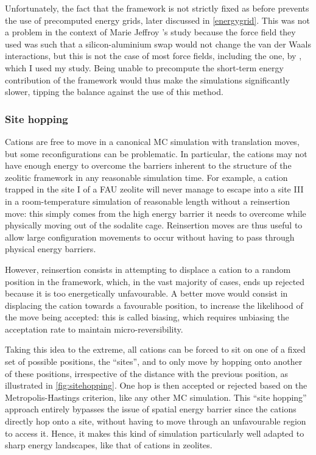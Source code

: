 \documentclass[main.tex]{subfiles}
\begin{document}
Unfortunately, the fact that the framework is not strictly fixed as before prevents the use of precomputed energy grids, later discussed in \cref{energygrid}. This was not a problem in the context of Marie Jeffroy \cite{Jeffroy}'s study because the force field they used was such that a silicon-aluminium swap would not change the van der Waals interactions, but this is not the case of most force fields, including the one, by \textcite{BoulfelfelSholl2021}, which I used my study. Being unable to precompute the short-term energy contribution of the framework would thus make the simulations significantly slower, tipping the balance against the use of this method.

\subsubsection{Site hopping}

\label{sitehopping}

Cations are free to move in a canonical MC simulation with translation moves, but some reconfigurations can be problematic. In particular, the cations may not have enough energy to overcome the barriers inherent to the structure of the zeolitic framework in any reasonable simulation time. For example, a cation trapped in the site I of a FAU zeolite will never manage to escape into a site III in a room-temperature simulation of reasonable length without a reinsertion move: this simply comes from the high energy barrier it needs to overcome while physically moving out of the sodalite cage. Reinsertion moves are thus useful to allow large configuration movements to occur without having to pass through physical energy barriers.

However, reinsertion consists in attempting to displace a cation to a random position in the framework, which, in the vast majority of cases, ends up rejected because it is too energetically unfavourable. A better move would consist in displacing the cation towards a favourable position, to increase the likelihood of the move being accepted: this is called biasing, which requires unbiasing the acceptation rate to maintain micro-reversibility.

Taking this idea to the extreme, all cations can be forced to sit on one of a fixed set of possible positions, the ``sites'', and to only move by hopping onto another of these positions, irrespective of the distance with the previous position, as illustrated in \cref{fig:sitehopping}. One hop is then accepted or rejected based on the Metropolis-Hastings criterion, like any other MC simulation. This ``site hopping'' approach entirely bypasses the issue of spatial energy barrier since the cations directly hop onto a site, without having to move through an unfavourable region to access it. Hence, it makes this kind of simulation particularly well adapted to sharp energy landscapes, like that of cations in zeolites.
\end{document}

